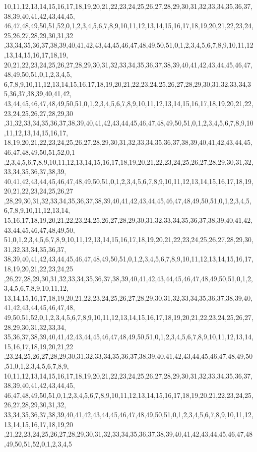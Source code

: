 \begin{DoxyCode}
      10,11,12,13,14,15,16,17,18,19,20,21,22,23,24,25,26,27,28,29,30,31,32,33,34,35,36,37,38,39,40,41,42,43,44,45,
      46,47,48,49,50,51,52,0,1,2,3,4,5,6,7,8,9,10,11,12,13,14,15,16,17,18,19,20,21,22,23,24,25,26,27,28,29,30,31,32
      ,33,34,35,36,37,38,39,40,41,42,43,44,45,46,47,48,49,50,51,0,1,2,3,4,5,6,7,8,9,10,11,12,13,14,15,16,17,18,19,
      20,21,22,23,24,25,26,27,28,29,30,31,32,33,34,35,36,37,38,39,40,41,42,43,44,45,46,47,48,49,50,51,0,1,2,3,4,5,
      6,7,8,9,10,11,12,13,14,15,16,17,18,19,20,21,22,23,24,25,26,27,28,29,30,31,32,33,34,35,36,37,38,39,40,41,42,
      43,44,45,46,47,48,49,50,51,0,1,2,3,4,5,6,7,8,9,10,11,12,13,14,15,16,17,18,19,20,21,22,23,24,25,26,27,28,29,30
      ,31,32,33,34,35,36,37,38,39,40,41,42,43,44,45,46,47,48,49,50,51,0,1,2,3,4,5,6,7,8,9,10,11,12,13,14,15,16,17,
      18,19,20,21,22,23,24,25,26,27,28,29,30,31,32,33,34,35,36,37,38,39,40,41,42,43,44,45,46,47,48,49,50,51,52,0,1
      ,2,3,4,5,6,7,8,9,10,11,12,13,14,15,16,17,18,19,20,21,22,23,24,25,26,27,28,29,30,31,32,33,34,35,36,37,38,39,
      40,41,42,43,44,45,46,47,48,49,50,51,0,1,2,3,4,5,6,7,8,9,10,11,12,13,14,15,16,17,18,19,20,21,22,23,24,25,26,27
      ,28,29,30,31,32,33,34,35,36,37,38,39,40,41,42,43,44,45,46,47,48,49,50,51,0,1,2,3,4,5,6,7,8,9,10,11,12,13,14,
      15,16,17,18,19,20,21,22,23,24,25,26,27,28,29,30,31,32,33,34,35,36,37,38,39,40,41,42,43,44,45,46,47,48,49,50,
      51,0,1,2,3,4,5,6,7,8,9,10,11,12,13,14,15,16,17,18,19,20,21,22,23,24,25,26,27,28,29,30,31,32,33,34,35,36,37,
      38,39,40,41,42,43,44,45,46,47,48,49,50,51,0,1,2,3,4,5,6,7,8,9,10,11,12,13,14,15,16,17,18,19,20,21,22,23,24,25
      ,26,27,28,29,30,31,32,33,34,35,36,37,38,39,40,41,42,43,44,45,46,47,48,49,50,51,0,1,2,3,4,5,6,7,8,9,10,11,12,
      13,14,15,16,17,18,19,20,21,22,23,24,25,26,27,28,29,30,31,32,33,34,35,36,37,38,39,40,41,42,43,44,45,46,47,48,
      49,50,51,52,0,1,2,3,4,5,6,7,8,9,10,11,12,13,14,15,16,17,18,19,20,21,22,23,24,25,26,27,28,29,30,31,32,33,34,
      35,36,37,38,39,40,41,42,43,44,45,46,47,48,49,50,51,0,1,2,3,4,5,6,7,8,9,10,11,12,13,14,15,16,17,18,19,20,21,22
      ,23,24,25,26,27,28,29,30,31,32,33,34,35,36,37,38,39,40,41,42,43,44,45,46,47,48,49,50,51,0,1,2,3,4,5,6,7,8,9,
      10,11,12,13,14,15,16,17,18,19,20,21,22,23,24,25,26,27,28,29,30,31,32,33,34,35,36,37,38,39,40,41,42,43,44,45,
      46,47,48,49,50,51,0,1,2,3,4,5,6,7,8,9,10,11,12,13,14,15,16,17,18,19,20,21,22,23,24,25,26,27,28,29,30,31,32,
      33,34,35,36,37,38,39,40,41,42,43,44,45,46,47,48,49,50,51,0,1,2,3,4,5,6,7,8,9,10,11,12,13,14,15,16,17,18,19,20
      ,21,22,23,24,25,26,27,28,29,30,31,32,33,34,35,36,37,38,39,40,41,42,43,44,45,46,47,48,49,50,51,52,0,1,2,3,4,5

\end{DoxyCode}
